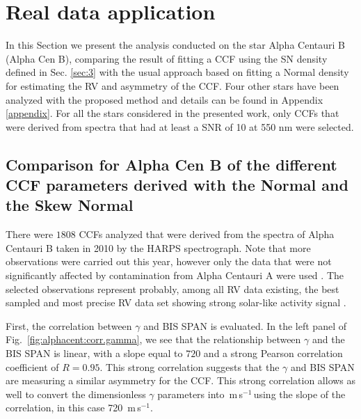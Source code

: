 \documentclass{aa}
\def\ms{\hbox{\,m\,s$^{-1}$}}         %
\newcommand{\xavier}[1]{{\color{blue}[[\textbf{Xavier: }#1]]}}
\begin{document}
\section{Real data application} \label{sec:4}

In this Section we present the analysis conducted on the star Alpha Centauri B (Alpha Cen B), comparing the result of fitting a CCF using the SN density defined in Sec. \ref{sec:3} with the usual approach based on fitting a Normal density for estimating the RV and asymmetry of the CCF. 
Four other stars have been analyzed with the proposed method and details can be found in Appendix \ref{appendix}. 
For all the stars considered in the presented work, only CCFs that were derived from spectra that had at least a SNR of 10 at 550 nm were selected. 


\subsection{Comparison for Alpha Cen B of the different CCF parameters derived with the Normal and the Skew Normal} \label{sec:alphacentb}

There were $1808$ CCFs analyzed that were derived from the spectra of Alpha Centauri B taken in 2010 by the HARPS spectrograph. Note that more observations were carried out this year, however only the data that were not significantly affected by contamination from Alpha Centauri A were used \citep[see][]{Dumusque-2012}. 
The selected observations represent probably, among all RV data existing, the best sampled and most precise RV data set showing strong solar-like activity signal \citep{Thompson-2017, Dumusque-2012}.

First, the correlation between $\gamma$ and BIS SPAN is evaluated.
In the left panel of Fig.~\ref{fig:alphacent:corr.gamma}, we see that the relationship between $\gamma$ and the BIS SPAN is linear, with a slope equal to $720$ and a strong Pearson correlation coefficient of $R=0.95$. This strong correlation suggests that the $\gamma$ and BIS SPAN are measuring a similar asymmetry for the CCF. This strong correlation allows as well to convert the dimensionless $\gamma$ parameters into \ms\,using the slope of the correlation, in this case 720 \ms.
\end{document}
